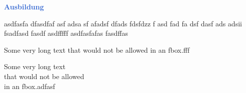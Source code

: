 \documentclass{article}
\newenvironment{right_side}%
{%
    \hspace{1cm}
    \begin{minipage}[t][][t]{0.6\textwidth}
}%
{
    \end{minipage}
}%
\newcommand{\profilesection}[1]{%
    \vspace{-3mm}
    {\par\huge\textcolor{highlight}{\textbf{#1}}
     \hspace{5pt}\textcolor{highlight}{\sout{\hfill}}}\par%
}
\begin{document}
\begin{right_side} 
    \profilesection{Ausbildung}

    asdfasfa dfasdfaf asf adsa sf afadsf dfads fdsfdzz
    f
    asd fad fa dsf dasf ads
    adsii
    fsadfasd fasdf asdfffff
    asdfasfafas
    fasdffas

    \parbox{\textwidth}{
      Some very long text
      that would not be allowed
      in an fbox.fff
    }

    \parbox{\textwidth}{
      Some very long text\\
      that would not be allowed\\
      in an fbox.adfasf
    }

    \end{right_side}
\end{document}
